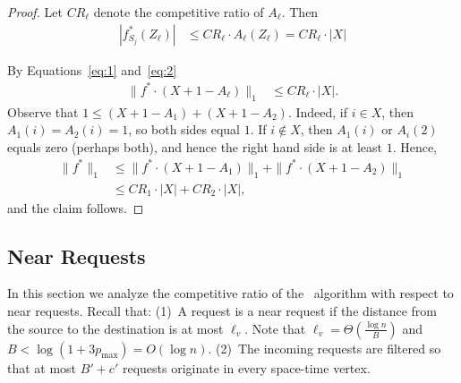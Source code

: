 \documentclass[11pt]{article}
\newcommand{\routenear}{\text{\sc{route-near}}\xspace}
\newcommand{\pmax}{p_{\max}}
\newenvironment{proof sketch}[1]{\noindent {\emph{Proof sketch of #1:}}}{\hfill \qed}
\newcommand{\vl}{\ell_v}
\begin{document}
\begin{proof}
Let $CR_{\ell}$ denote the competitive ratio of $A_{\ell}$. Then
\begin{align}
  |f^*_{S_j} (Z_{\ell})| &\leq CR_{\ell} \cdot A_{\ell}(Z_{\ell}) = CR_{\ell} \cdot |X|
\label{eq:2}
\end{align}

By Equations~\ref{eq:1} and~\ref{eq:2}
\begin{align}
  \label{eq:3}
   \|f^*\cdot (X+1-A_{\ell})\|_1 &\leq CR_{\ell} \cdot |X|.
\end{align}
Observe that $1\leq (X+1-A_1) + (X+1-A_2)$. Indeed, if $i\in X$, then
$A_1(i)=A_2(i)=1$, so both sides equal $1$. If $i\notin X$, then $A_1(i)$ or $A_i(2)$
equals zero (perhaps both), and hence the right hand side is at least $1$.
Hence,
\begin{align*}
   \|f^*\|_1 &\leq  \|f^*\cdot (X+1-A_1)\|_1  +  \|f^*\cdot (X+1-A_2)\|_1 \\
&\leq CR_1 \cdot |X| + CR_2 \cdot |X|,
\end{align*}
and the claim follows.
\end{proof}

\subsection{Near Requests}
In this section we analyze the competitive ratio of the \routenear\ algorithm with
respect to near requests.  Recall that: (1)~A request is a near request if
the distance from the source to the destination is at most $\vl$. Note that
$\vl=\Theta(\frac{\log n}{B})$ and $B<\log (1+3\pmax)=O(\log n)$.  (2)~The
incoming requests are filtered so that at most $B'+c'$ requests originate in every
space-time vertex.
\end{document}
